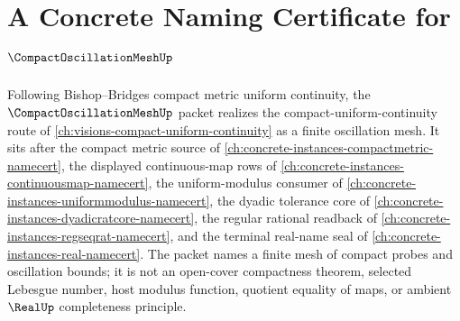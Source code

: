 \chapter{A Concrete Naming Certificate for $\CompactOscillationMeshUp$}
\label{ch:concrete-instances-compact-oscillation-mesh-namecert}

Following Bishop--Bridges compact metric uniform continuity, the $\CompactOscillationMeshUp$ packet realizes the compact-uniform-continuity route of \autoref{ch:visions-compact-uniform-continuity} as a finite oscillation mesh. It sits after the compact metric source of \autoref{ch:concrete-instances-compactmetric-namecert}, the displayed continuous-map rows of \autoref{ch:concrete-instances-continuousmap-namecert}, the uniform-modulus consumer of \autoref{ch:concrete-instances-uniformmodulus-namecert}, the dyadic tolerance core of \autoref{ch:concrete-instances-dyadicratcore-namecert}, the regular rational readback of \autoref{ch:concrete-instances-regseqrat-namecert}, and the terminal real-name seal of \autoref{ch:concrete-instances-real-namecert}. The packet names a finite mesh of compact probes and oscillation bounds; it is not an open-cover compactness theorem, selected Lebesgue number, host modulus function, quotient equality of maps, or ambient $\RealUp$ completeness principle.


